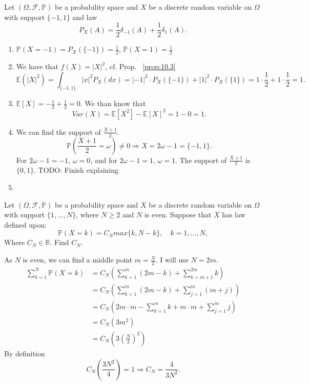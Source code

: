 \begin{exercise}[]
    \label{ex:12.2}
    Let $(\Omega, \mathcal{F}, \mathbb{P})$ be a probability space and $X$ be a discrete random variable on $\Omega$ with 
    support $\{-1,1\} $ and law
    \[
    P_X(A)= \frac{1}{2} \delta_{-1}(A)+\frac{1}{2}\delta_1(A)
    .\] 
    \begin{enumerate}[label=(\alph*)]
        \item
            $\mathbb{P}(X=-1)= P_X(\{-1\} ) = \frac{1}{2}$,
            $\mathbb{P}(X=1) = \frac{1}{2}$
        \item We have that $f(X)=|X|^{2}$, cf. Prop. ~\ref{prop:10.3}
            \[
            \mathbb{E}(|X|^{2}) = \int_{\{-1,1\} }|x|^{2}P_X(dx) = |-1|^{2} \cdot P_X(\{-1\} )+ |1|^{2}\cdot P_X(\{1\} )
            =1\cdot \frac{1}{2} + 1\cdot \frac{1}{2} =1
            .\] 
        \item $\mathbb{E}[X] = -\frac{1}{2} + \frac{1}{2}= 0$. We than know that
            \[
            Var(X) =\mathbb{E}[X^{2}] - \mathbb{E}[X]^{2} = 1-0=1
            .\] 
        \item
            We can find the support of $\frac{X+1}{2}$.
            \[
                \mathbb{P}(\frac{X+1}{2}=\omega)\neq 0 \Rightarrow X = 2\omega - 1 = \{-1,1\} 
            .\] 
            For $2\omega-1 = -1$, $\omega=0$, and for  $2\omega-1 = 1$,  $\omega=1$. The support of  $\frac{X+1}{2}$ is $\{0,1\} $.
            TODO: Finish explaining
        \item

    \end{enumerate}
\end{exercise}

\begin{exercise}[]
    \label{ex:12.3}
\end{exercise}
\begin{exercise}[]
    \label{ex:12.4}
\end{exercise}
\begin{exercise}[]
    \label{ex:12.5}
    Let $(\Omega, \mathcal{F}, \mathbb{P})$ be a probability space and $X$ be a discrete random variable on $\Omega$ with 
    support $\{1,\ldots, N\} $, where $N\ge 2$ and $N$ is even. Suppose that $X$ has law defined upon:
    \[
    \mathbb{P}(X=k) = C_N max \{k, N-k\}, \quad k=1,\ldots,N
    ,\] 
    Where $C_N \in \mathbb{R}$. Find $C_N$.

    As $N$ is even, we can find a middle point $m = \frac{N}{2}$. I will use $N=2m$.
    \begin{align*}
    \sum_{k=1}^{N} \mathbb{P}(X = k) &= C_N(\sum_{k=1}^{m} (2m - k) + \sum_{k=m+1}^{2m} k )\\
    &= C_N(\sum_{k=1}^{m} (2m - k) + \sum_{j=1}^{m} (m + j)) \\
    &= C_N(2m\cdot m - \sum_{k=1}^{m} k + m\cdot m  + \sum_{j=1}^{m} j) \\
    &= C_N(3m^{2}) \\
    &= C_N(3(\frac{N}{2})^{2})
    \end{align*}
    By definition
    \[
    C_N(\frac{3N^{2}}{4}) = 1 \Rightarrow C_N = \frac{4}{3N^{2}}
    .\] 
\end{exercise}
